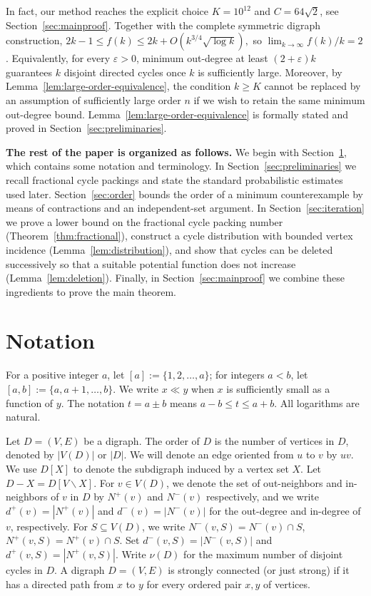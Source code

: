 \documentclass[a4paper,12pt]{article}
\numberwithin{equation}{section}
\begin{document}
In fact, our method reaches the explicit choice
$K=10^{12}$ and $C=64\sqrt2$, see Section~\ref{sec:mainproof}.   Together with the complete symmetric digraph construction,
$ 2k-1\le f(k)\le 2k+O\!\left(k^{3/4}\sqrt{\log k}\right), $
so $\lim_{k\to\infty}f(k)/k=2$. Equivalently, for every $\varepsilon>0$, minimum out-degree at least $(2+\varepsilon)k$ guarantees $k$ disjoint directed cycles once $k$ is sufficiently large. Moreover, by Lemma~\ref{lem:large-order-equivalence}, the condition $k\ge K$ cannot be replaced by an assumption of sufficiently large order $n$ if we wish to retain the same minimum out-degree bound.  Lemma~\ref{lem:large-order-equivalence} is formally stated and proved in Section~\ref{sec:preliminaries}.

\bigskip
\textbf{The rest of the paper is organized as follows.}
We begin with Section~\ref{sec:notation}, which contains some notation and terminology.
In Section~\ref{sec:preliminaries} we recall fractional cycle packings and state the standard probabilistic estimates used later. 
Section~\ref{sec:order} bounds the order of a minimum counterexample
by means of contractions and an independent-set argument.
In Section~\ref{sec:iteration} we prove a lower bound on the fractional
cycle packing number (Theorem~\ref{thm:fractional}), construct a cycle
distribution with bounded vertex incidence
(Lemma~\ref{lem:distribution}), and show that cycles can be deleted
successively so that a suitable potential function does not increase
(Lemma~\ref{lem:deletion}). Finally, in Section~\ref{sec:mainproof} we
combine these ingredients to prove the main theorem.


\section{Notation}\label{sec:notation}


For a positive integer $a$, let $[a]:=\{1,2,\ldots,a\}$; for integers $a<b$, let $[a,b]:=\{a,a+1,\ldots,b\}$. We write $x\ll y$ when $x$ is sufficiently small as a function of $y$. The notation $t=a\pm b$ means $a-b\leq t\leq a+b$. All logarithms are natural.


Let $D=(V,E)$ be a digraph.  The order of $D$ is the number of vertices in $D$,  denoted by $|V(D)|$ or $|D|$.  We will denote an edge oriented from $u$ to $v$ by $uv$. We use $D[X]$ to denote the subdigraph induced by a vertex set $X$. Let $D-X = D[V\backslash X]$.  For $v\in V(D)$, we denote the set of out-neighbors and in-neighbors of $v$ in $D$ by $N^+(v)$ and $N^-(v)$ respectively, and we write $d^+(v)=|N^+(v)|$ and $d^-(v)=|N^-(v)|$ for the out-degree and in-degree of $v$, respectively. For $S\subseteq V(D)$, we write $N^-(v,S)=N^-(v)\cap S$, $N^+(v,S)=N^+(v)\cap S$. Set $d^-(v,S)=|N^-(v,S)|$ and $d^+(v,S)=|N^+(v, S)|$.   %
Write $\nu(D)$ for the maximum number of disjoint cycles
in $D$. A digraph $D=(V,E)$ is strongly connected (or just strong) if it has a directed path from $x$ to $y$ for every ordered pair $x,y$ of vertices.
\end{document}

